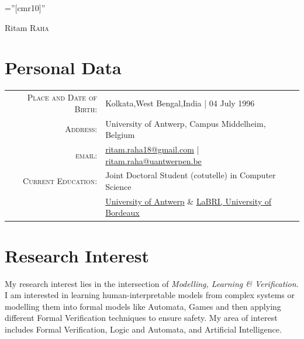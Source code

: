 \documentclass[a4paper,10pt]{article}
\begin{document}
\pagestyle{empty}
\font\fb=''[cmr10]'' 

\par{\centering
		{\Huge Ritam \textsc{Raha}
	}\bigskip\par}
	
\hfill {}

\section{Personal Data}
\begin{tabular}{rl}
    \textsc{Place and Date of Birth:} & Kolkata,West Bengal,India  | 04 July 1996 \\
    \textsc{Address:} &  University of Antwerp, Campus Middelheim, Belgium\\
    \textsc{email:}     & \href{mailto:ritam.raha18@gmail.com}{ritam.raha18@gmail.com} | \href{mailto:ritam.raha@uantwerpen.be}{ritam.raha@uantwerpen.be}\\
    \textsc{Current Education:}     & Joint Doctoral Student (cotutelle) in Computer Science\\
    & \href{https://www.uantwerpen.be/en/}{University of Antwerp} \& \href{https://www.labri.fr/}{LaBRI, University of Bordeaux}
\end{tabular}

\section{Research Interest}

My research interest lies in the intersection of \emph{Modelling, Learning \& Verification}. I am interested in learning human-interpretable models from complex systems or modelling them into formal models like Automata, Games and then applying different Formal Verification techniques to ensure safety. My area of interest includes Formal Verification, Logic and Automata, and Artificial Intelligence.
\end{document}
